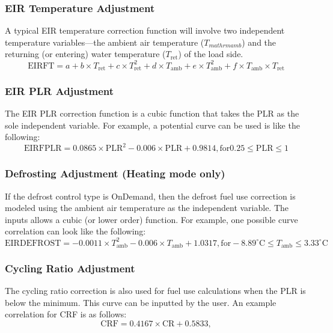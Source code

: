 \subsubsection{EIR Temperature Adjustment}
A typical EIR temperature correction function will involve two independent temperature variables---the ambient air temperature ($T_{mathrm{amb}}$) and the returning (or entering) water temperature ($T_{\mathrm{ret}}$) of the load side. 
\begin{equation}
\mathrm{EIRFT} = a + b \times T_{\mathrm{ret}} + c \times T_{\mathrm{ret}}^{2} + d \times T_{\mathrm{amb}} + e \times T_{\mathrm{amb}}^{2} + f \times T_{\mathrm{amb}} \times T_{\mathrm{ret}}
\end{equation}

\subsubsection{EIR PLR Adjustment}
The EIR PLR correction function is a cubic function that takes the PLR as the sole independent variable. For example, a potential curve can be used is like the following:  
\begin{equation}
\mathrm{EIRFPLR} = 0.0865 \times \mathrm{PLR}^{2} - 0.006 \times \mathrm{PLR} + 0.9814, \mathrm{for } 0.25 \leq \mathrm{PLR} \leq 1
\end{equation}

\subsubsection{Defrosting Adjustment (Heating mode only)}
If the defrost control type is OnDemand, then the defrost fuel use correction is modeled using the ambient air temperature as the independent variable. The inputs allows a cubic (or lower order) function. For example, one possible curve correlation can look like the following:  
\begin{equation}
\mathrm{EIRDEFROST} = -0.0011 \times T_{\mathrm{amb}}^{2} - 0.006 \times T_{\mathrm{amb}} + 1.0317, \mathrm{for} -8.89^{\circ}\mathrm{C} \leq T_{\mathrm{amb}} \leq 3.33^{\circ}\mathrm{C} 
\end{equation}

\subsubsection{Cycling Ratio Adjustment}
The cycling ratio correction is also used for fuel use calculations when the PLR is below the minimum. This curve can be inputted by the user. An example correlation for CRF is as follows: 
\begin{equation}
\mathrm{CRF} = 0.4167 \times \mathrm{CR} + 0.5833,
\end{equation}

